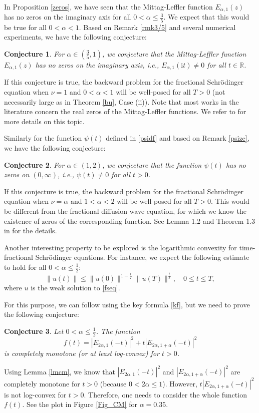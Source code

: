 \documentclass[reqno]{amsart}
\newtheorem{conj}{Conjecture}
\numberwithin{equation}{section}
\begin{document}
In Proposition \ref{zeros}, we have seen that the Mittag-Leffler function $E_{\alpha,1}(z)$ has no zeros on the imaginary axis for all $0<\alpha\le \frac{3}{5}$. We expect that this would be true for all $0<\alpha<1$. Based on Remark \ref{rmk3/5} and several numerical experiments, we have the following conjecture:
\begin{conj}
For $\alpha\in\left(\frac{3}{5}, 1\right)$, we conjecture that the Mittag-Leffler function $E_{\alpha,1}(z)$ has no zeros on the imaginary axis, i.e., $E_{\alpha,1}(\mathrm{i} t)\neq 0$ for all $t\in\mathbb{R}$.
\end{conj}
If this conjecture is true, the backward problem for the fractional Schrödinger equation when $\nu=1$ and $0<\alpha<1$ will be well-posed for all $T>0$ (not necessarily large as in Theorem \ref{bu}, Case (ii)). Note that most works in the literature concern the real zeros of the Mittag-Leffler functions. We refer to \cite{Se0,Se04,Ps05,PS13} for more details on this topic.

Similarly for the function $\psi(t)$ defined in \eqref{psidf} and based on Remark \ref{psize}, we have the following conjecture:
\begin{conj}
For $\alpha\in (1,2)$, we conjecture that the function $\psi(t)$ has no zeros on $(0,\infty)$, i.e., $\psi(t)\neq 0$ for all $t>0$.
\end{conj}
If this conjecture is true, the backward problem for the fractional Schrödinger equation when $\nu=\alpha$ and $1<\alpha<2$ will be well-posed for all $T>0$. This would be different from the fractional diffusion-wave equation, for which we know the existence of zeros of the corresponding function. See Lemma 1.2 and Theorem 1.3 in \cite{FY20} for the details.

Another interesting property to be explored is the logarithmic convexity for time-fractional Schrödinger equations. For instance, we expect the following estimate to hold for all $0<\alpha \leq \frac{1}{2}$:
\begin{equation}\label{lce}
\|u(t)\| \leq \|u(0)\|^{1-\frac{t}{T}}\|u(T)\|^{\frac{t}{T}}, \quad 0 \leq t \leq T,
\end{equation}
where $u$ is the weak solution to \eqref{fseq}.

For this purpose, we can follow \cite[Theorem 1.1]{Ch24} using the key formula \eqref{kf}, but we need to prove the following conjecture:
\begin{conj}
Let $0<\alpha \leq \frac{1}{2}$. The function
\begin{equation}
f(t)=|E_{2 \alpha,1}\left(-t\right)|^2 + t |E_{2 \alpha, 1+\alpha}\left(-t\right)|^2
\end{equation}
is completely monotone (or at least log-convex) for $t>0$.
\end{conj}
Using Lemma \ref{lmcm}, we know that $|E_{2 \alpha,1}\left(-t\right)|^2$ and $|E_{2 \alpha, 1+\alpha}\left(-t\right)|^2$ are completely monotone for $t>0$ (because $0<2\alpha \le 1$). However, $t |E_{2 \alpha, 1+\alpha}\left(-t\right)|^2$ is not log-convex for $t>0$. Therefore, one needs to consider the whole function $f(t)$. See the plot in Figure \ref{Fig_CM} for $\alpha=0.35$.
\end{document}

